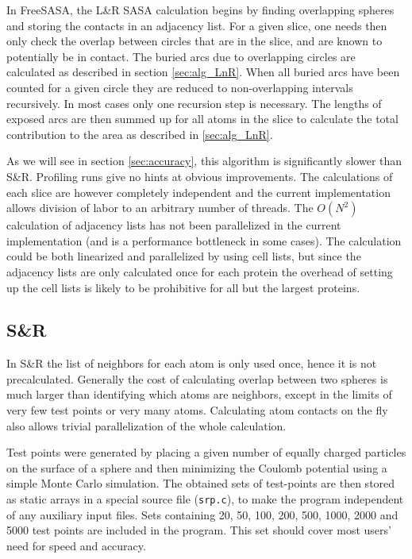 \documentclass[a4paper,11pt]{article}
\begin{document}
In FreeSASA, the L\&R SASA calculation begins by finding overlapping
spheres and storing the contacts in an adjacency list. For a given
slice, one needs then only check the overlap between circles that are
in the slice, and are known to potentially be in contact. The buried
arcs due to overlapping circles are calculated as described in section
\ref{sec:alg_LnR}. When all buried arcs have been counted for a given
circle they are reduced to non-overlapping intervals recursively. In
most cases only one recursion step is necessary. The lengths of
exposed arcs are then summed up for all atoms in the slice to
calculate the total contribution to the area as described in
\ref{sec:alg_LnR}.

As we will see in section \ref{sec:accuracy}, this algorithm is
significantly slower than S\&R. Profiling runs give no hints at
obvious improvements. The calculations of each slice are however
completely independent and the current implementation allows division
of labor to an arbitrary number of threads. The $O(N^2)$ calculation
of adjacency lists has not been parallelized in the current
implementation (and is a performance bottleneck in some cases). The
calculation could be both linearized and parallelized by using cell
lists, but since the adjacency lists are only calculated once for each
protein the overhead of setting up the cell lists is likely to be
prohibitive for all but the largest proteins.

\subsection{S\&R}

In S\&R the list of neighbors for each atom is only used once, hence
it is not precalculated. Generally the cost of calculating overlap
between two spheres is much larger than identifying which atoms are
neighbors, except in the limits of very few test points or very many
atoms. Calculating atom contacts on the fly also allows trivial
parallelization of the whole calculation.

Test points were generated by placing a given number of equally
charged particles on the surface of a sphere and then minimizing the
Coulomb potential using a simple Monte Carlo simulation. The obtained
sets of test-points are then stored as static arrays in a special
source file (\texttt{srp.c}), to make the program independent of any
auxiliary input files. Sets containing 20, 50, 100, 200, 500, 1000,
2000 and 5000 test points are included in the program. This set should
cover most users' need for speed and accuracy.
\end{document}
